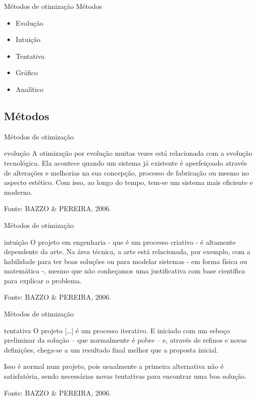 \documentclass{beamer}
\begin{document}
\begin{frame}{Métodos de otimização}
  Métodos

  \begin{itemize}
  \item Evolução
  \item Intuição
  \item Tentativa
  \item Gráfico
  \item Analítico
  \end{itemize}
\end{frame}

\subsection{Métodos}

\begin{frame}{Métodos de otimização}
  \begin{block}{evolução}
    A otimização por evolução muitas vezes está relacionada com a
    evolução tecnológica. Ela acontece quando um sistema já existente
    é aperfeiçoado através de alterações e melhorias na sua concepção,
    processo de fabricação ou mesmo no aspecto estético. Com isso, ao
    longo do tempo, tem-se um sistema mais eficiente e moderno.
  \end{block}

\vfill
Fonte: BAZZO \& PEREIRA, 2006.
\end{frame}

\begin{frame}{Métodos de otimização}
    \begin{block}{intuição}
    O projeto em engenharia - que é um processo criativo - é altamente
dependente da arte. Na área técnica, a arte está relacionada, por exemplo, com
a habilidade para ter boas soluções ou para modelar sistemas - em forma
física ou matemática -, mesmo que não conheçamos uma justificativa com
base científica para explicar o problema.
  \end{block}

\vfill
Fonte: BAZZO \& PEREIRA, 2006.
\end{frame}

\begin{frame}{Métodos de otimização}
    \begin{block}{tentativa}
      O projeto [\ldots] é um processo iterativo. E iniciado com um
      esboço preliminar da solução -- que normalmente é pobre -- e,
      através de refinos e novas definições, chega-se a um resultado
      final melhor que a proposta inicial.
  \end{block}
  \begin{block}{}
    Isso é normal num projeto, pois usualmente a primeira alternativa
    não é satisfatória, sendo necessárias novas tentativas para
    encontrar uma boa solução.
  \end{block}

\vfill
Fonte: BAZZO \& PEREIRA, 2006.
\end{frame}
\end{document}
